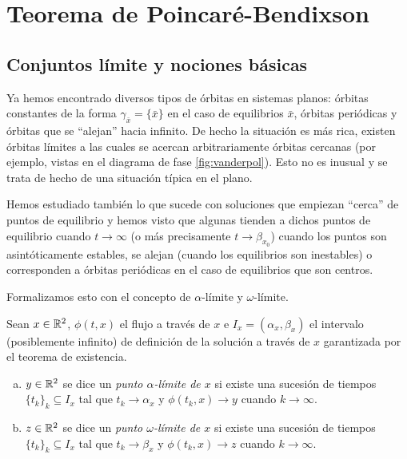\chapter{Teorema de Poincaré-Bendixson} \label{cap:poincarebendixson}

\section{Conjuntos límite y nociones básicas}

Ya hemos encontrado diversos tipos de órbitas en sistemas planos: órbitas constantes de la forma $\gamma_{\bar{x}} = \{\bar{x}\}$ en el caso de equilibrios $\bar{x}$, órbitas periódicas y órbitas que se ``alejan'' hacia infinito.
De hecho la situación es más rica, existen órbitas límites a las cuales se acercan arbitrariamente órbitas cercanas (por ejemplo, vistas en el diagrama de fase \ref{fig:vanderpol}). Esto no es inusual y se trata de hecho de una situación típica en el plano.

Hemos estudiado también lo que sucede con soluciones que empiezan ``cerca'' de puntos de equilibrio y hemos visto que algunas tienden a dichos puntos de equilibrio cuando $t \to \infty$ (o más precisamente $t \to \beta_{x_0}$) cuando los puntos son asintóticamente estables, se alejan (cuando los equilibrios son inestables) o corresponden a órbitas periódicas en el caso de equilibrios que son centros.

Formalizamos esto con el concepto de $\alpha$-límite y $\omega$-límite.

\begin{definition}Sean $x \in {\ensuremath{\mathbb{R}}}^2$, $\phi(t,x)$ el flujo a través de $x$ e $I_x = (\alpha_x, \beta_x)$ el intervalo (posiblemente infinito) de definición de la solución a través de $x$ garantizada por el teorema de existencia.

\begin{enumerate}[(a)]
	\item $y\in {\ensuremath{\mathbb{R}}}^2$ se dice un \emph{punto $\alpha$-límite de $x$} si existe una sucesión de tiempos $\{ t_k \}_k \subseteq I_x$ tal que $t_k \to \alpha_x$ y $\phi(t_k, x) \to y$ cuando $k \to \infty$.
	\item $z\in {\ensuremath{\mathbb{R}}}^2$ se dice un \emph{punto $\omega$-límite de $x$} si existe una sucesión de tiempos $\{ t_k \}_k \subseteq I_x$ tal que $t_k \to \beta_x$ y $\phi(t_k, x) \to z$ cuando $k \to \infty$.
\end{enumerate}

\end{definition}

